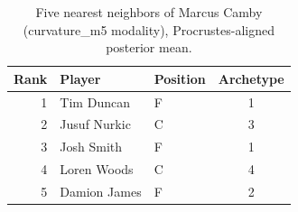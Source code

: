 \begin{table}[htbp]
  \centering\small
  \begin{tabular}{rllc}
    \toprule
    Rank & Player & Position & Archetype \\
    \midrule
    1 & Tim Duncan & F & 1 \\
    2 & Jusuf Nurkic & C & 3 \\
    3 & Josh Smith & F & 1 \\
    4 & Loren Woods & C & 4 \\
    5 & Damion James & F & 2 \\
    \bottomrule
  \end{tabular}
  \caption{Five nearest neighbors of Marcus Camby (curvature_m5 modality), Procrustes-aligned posterior mean.}
  \label{tab:Marcus_Camby_neighbors_curvature_m5}
\end{table}

